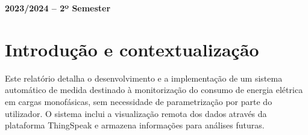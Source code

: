 \documentclass[12pt]{article}
\begin{document}

    \vspace{4cm}

    \begin{center}
        \large \bf 2023/2024 -- 2º Semester
    \end{center}

    \thispagestyle{empty}

    \setcounter{page}{0}

    \newpage

    \newpage

    \tableofcontents %

    \newpage

    \listoffigures

    \newpage
    \section{Introdução e contextualização}
    Este relatório detalha o desenvolvimento e a implementação de um 
sistema automático de medida destinado à monitorização do consumo 
de energia elétrica em cargas monofásicas, sem necessidade de parametrização 
por parte do utilizador. O sistema inclui a visualização remota dos
dados através da plataforma ThingSpeak e armazena informações para
análises futuras.
\end{document}

